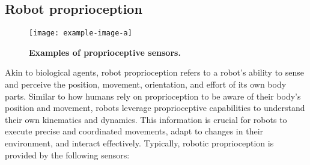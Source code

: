 \subsection{Robot proprioception}
\begin{figure}
	\begin{center}
		\texttt{[image: example-image-a]}
		\caption{\textbf{Examples of proprioceptive sensors.}}
		\label{fig:example_proprioceptive_sensors}
	\end{center}
\end{figure}
Akin to biological agents, robot proprioception refers to a robot's ability to sense and perceive the position, movement, orientation, and effort of its own body parts. Similar to how humans rely on proprioception to be aware of their body's position and movement, robots leverage proprioceptive capabilities to understand their own kinematics and dynamics. This information is crucial for robots to execute precise and coordinated movements, adapt to changes in their environment, and interact effectively. Typically, robotic proprioception is provided by the following sensors\cite{Siegwart2011Introductionautonomousmobile}:
